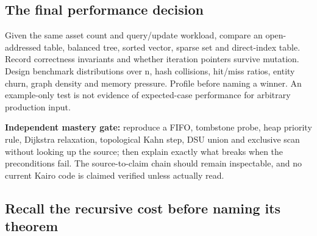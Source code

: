 \subsection{The final performance decision}\label{appendix-8a046b38375e-the-final-performance-decision}

\hypertarget{appendix-8a046b38375e-the-final-performance-decision}{}

Given the same asset count and query/update workload, compare an open-addressed table, balanced tree, sorted vector, sparse set and direct-index table. Record correctness invariants and whether iteration pointers survive mutation. Design benchmark distributions over n, hash collisions, hit/miss ratios, entity churn, graph density and memory pressure. Profile before naming a winner. An example-only test is not evidence of expected-case performance for arbitrary production input.

\textbf{Independent mastery gate:} reproduce a FIFO, tombstone probe, heap priority rule, Dijkstra relaxation, topological Kahn step, DSU union and exclusive scan without looking up the source; then explain exactly what breaks when the preconditions fail. The source-to-claim chain should remain inspectable, and no current Kairo code is claimed verified unless actually read.

\subsection{Recall the recursive cost before naming its theorem}\label{appendix-8a046b38375e-recall-the-recursive-cost-before-naming-its-theorem}

\hypertarget{appendix-8a046b38375e-recall-the-recursive-cost-before-naming-its-theorem}{}


